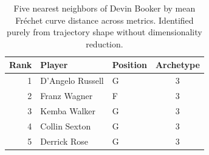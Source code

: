 \begin{table}[htbp]
  \centering\small
  \begin{tabular}{rllc}
    \toprule
    Rank & Player & Position & Archetype \\
    \midrule
    1 & D'Angelo Russell & G & 3 \\
    2 & Franz Wagner & F & 3 \\
    3 & Kemba Walker & G & 3 \\
    4 & Collin Sexton & G & 3 \\
    5 & Derrick Rose & G & 3 \\
    \bottomrule
  \end{tabular}
  \caption{Five nearest neighbors of Devin Booker by mean Fr\'{e}chet curve distance across metrics. Identified purely from trajectory shape without dimensionality reduction.}
  \label{tab:Devin_Booker_frechet_curve_neighbors}
\end{table}

